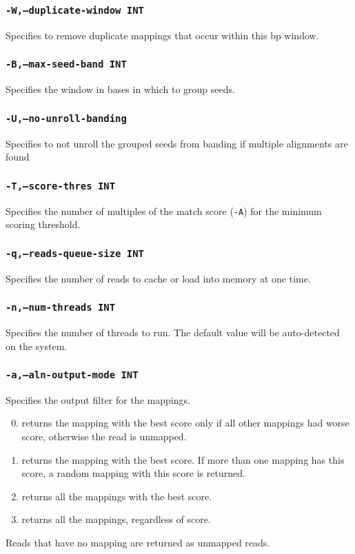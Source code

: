 \documentclass[a4paper,12pt]{book}
\newcommand{\TT}[1]{{\tt #1}} %
\begin{document}
\subsubsection{\TT{-W,--duplicate-window INT}}
Specifies to remove duplicate mappings that occur within this bp window.

\subsubsection{\TT{-B,--max-seed-band INT}}
Specifies the window in bases in which to group seeds.

\subsubsection{\TT{-U,--no-unroll-banding}}
Specifies to not unroll the grouped seeds from banding if multiple alignments are found

\subsubsection{\TT{-T,--score-thres INT}}
Specifies the number of multiples of the match score (\TT{-A}) for the minimum scoring threshold.

\subsubsection{\TT{-q,--reads-queue-size INT}}
Specifies the number of reads to cache or load into memory at one time.

\subsubsection{\TT{-n,--num-threads INT}}
Specifies the number of threads to run.
The default value will be auto-detected on the system.

\subsubsection{\TT{-a,--aln-output-mode INT}}
Specifies the output filter for the mappings.
\begin{enumerate}
	\setcounter{enumi}{-1} %
	\item returns the mapping with the best score only if all other mappings had worse score, otherwise the read is unmapped.
	\item returns the mapping with the best score.  
		If more than one mapping has this score, a random mapping with this score is returned.
	\item returns all the mappings with the best score.
	\item returns all the mappings, regardless of score.
\end{enumerate}
Reads that have no mapping are returned as unmapped reads.
\end{document}
